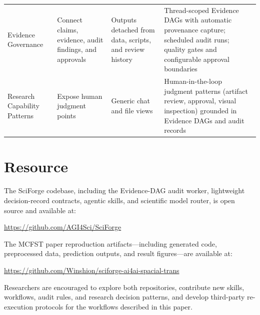 \documentclass[sn-basic,Numbered,pdflatex]{sn-jnl}
\begin{document}
\begin{appendices}
\begin{table}[ht!]
\begin{tabular}{@{}L{2.0cm} L{2.4cm} L{2.8cm} L{3.1cm}@{}}
Evidence Governance
& Connect claims, evidence, audit findings, and approvals
& Outputs detached from data, scripts, and review history
& Thread-scoped Evidence DAGs with automatic provenance capture; scheduled audit runs; quality gates and configurable approval boundaries \\
Research Capability Patterns
& Expose human judgment points
& Generic chat and file views
& Human-in-the-loop judgment patterns (artifact review, approval, visual inspection) grounded in Evidence DAGs and audit records \\
\bottomrule
\end{tabular}
\end{table}
\clearpage

\end{appendices}

\section*{Resource}

The SciForge codebase, including the Evidence-DAG audit worker, lightweight decision-record contracts, agentic skills, and scientific model router, is open source and available at:

\vspace{4pt}
\centering
\url{https://github.com/AGI4Sci/SciForge}
\vspace{8pt}

\noindent The MCFST paper reproduction artifacts---including generated code, preprocessed data, prediction outputs, and result figures---are available at:

\vspace{4pt}
\centering
\url{https://github.com/Winshion/sciforge-ai4ai-spacial-trans}
\vspace{8pt}

\noindent Researchers are encouraged to explore both repositories, contribute new skills, workflows, audit rules, and research decision patterns, and develop third-party re-execution protocols for the workflows described in this paper.


\end{document}
